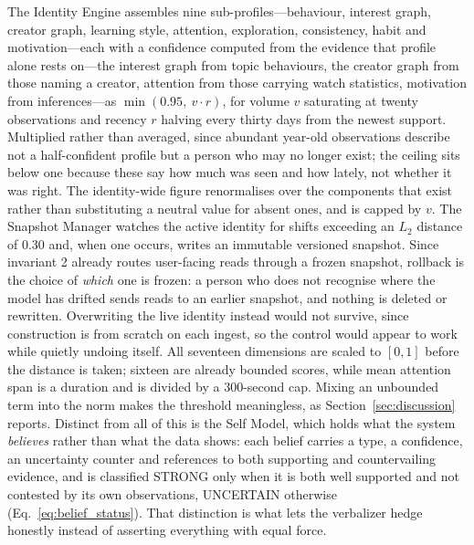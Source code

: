 \documentclass[conference]{IEEEtran}
\begin{document}
The Identity Engine assembles nine sub-profiles---behaviour, interest graph, creator graph, learning style, attention, exploration, consistency, habit and motivation---each with a confidence computed from the evidence that profile alone rests on---the interest graph from topic behaviours, the creator graph from those naming a creator, attention from those carrying watch statistics, motivation from inferences---as $\min(0.95,\ v \cdot r)$, for volume $v$ saturating at twenty observations and recency $r$ halving every thirty days from the newest support. Multiplied rather than averaged, since abundant year-old observations describe not a half-confident profile but a person who may no longer exist; the ceiling sits below one because these say how much was seen and how lately, not whether it was right. The identity-wide figure renormalises over the components that exist rather than substituting a neutral value for absent ones, and is capped by $v$. The Snapshot Manager watches the active identity for shifts exceeding an $L_2$ distance of $0.30$ and, when one occurs, writes an immutable versioned snapshot. Since invariant 2 already routes user-facing reads through a frozen snapshot, rollback is the choice of \emph{which} one is frozen: a person who does not recognise where the model has drifted sends reads to an earlier snapshot, and nothing is deleted or rewritten. Overwriting the live identity instead would not survive, since construction is from scratch on each ingest, so the control would appear to work while quietly undoing itself. All seventeen dimensions are scaled to $[0,1]$ before the distance is taken; sixteen are already bounded scores, while mean attention span is a duration and is divided by a 300-second cap. Mixing an unbounded term into the norm makes the threshold meaningless, as Section~\ref{sec:discussion} reports. Distinct from all of this is the Self Model, which holds what the system \emph{believes} rather than what the data shows: each belief carries a type, a confidence, an uncertainty counter and references to both supporting and countervailing evidence, and is classified STRONG only when it is both well supported and not contested by its own observations, UNCERTAIN otherwise (Eq.~\eqref{eq:belief_status}). That distinction is what lets the verbalizer hedge honestly instead of asserting everything with equal force.
\end{document}
